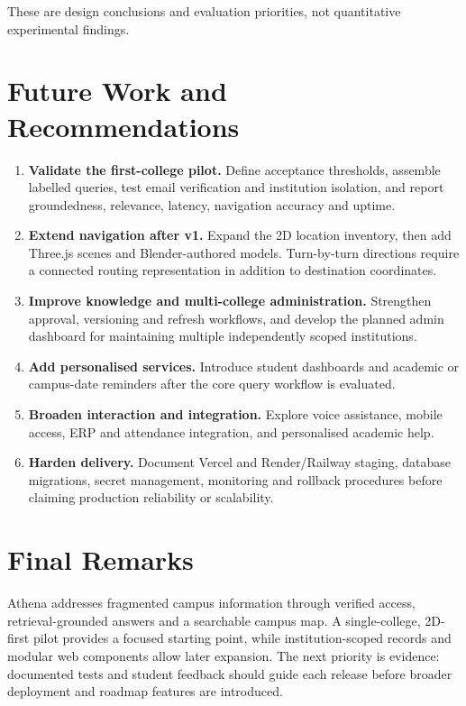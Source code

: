 \documentclass{tietreport}
\begin{document}
These are design conclusions and evaluation priorities, not quantitative
experimental findings.

\section{Future Work and Recommendations}

\begin{enumerate}
  \item \textbf{Validate the first-college pilot.} Define acceptance thresholds,
    assemble labelled queries, test email verification and institution isolation,
    and report groundedness, relevance, latency, navigation accuracy and uptime.
  \item \textbf{Extend navigation after v1.} Expand the 2D location inventory,
    then add Three.js scenes and Blender-authored models. Turn-by-turn directions
    require a connected routing representation in addition to destination coordinates.
  \item \textbf{Improve knowledge and multi-college administration.} Strengthen
    approval, versioning and refresh workflows, and develop the planned admin
    dashboard for maintaining multiple independently scoped institutions.
  \item \textbf{Add personalised services.} Introduce student dashboards and
    academic or campus-date reminders after the core query workflow is evaluated.
  \item \textbf{Broaden interaction and integration.} Explore voice assistance,
    mobile access, ERP and attendance integration, and personalised academic help.
  \item \textbf{Harden delivery.} Document Vercel and Render/Railway staging,
    database migrations, secret management, monitoring and rollback procedures
    before claiming production reliability or scalability.
\end{enumerate}

\section{Final Remarks}

Athena addresses fragmented campus information through verified access,
retrieval-grounded answers and a searchable campus map. A single-college,
2D-first pilot provides a focused starting point, while institution-scoped
records and modular web components allow later expansion. The next priority
is evidence: documented tests and student feedback should guide each release
before broader deployment and roadmap features are introduced.

\printbibliography[heading=bibintoc]
\end{document}
